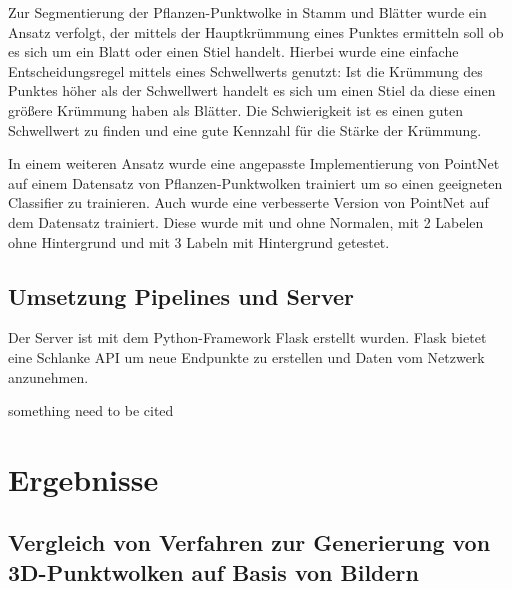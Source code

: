 \documentclass[12pt,titlepage]{article}
\begin{document}
Zur Segmentierung der Pflanzen-Punktwolke in Stamm und Blätter wurde ein Ansatz verfolgt, der mittels der Hauptkrümmung eines Punktes ermitteln soll ob es sich um ein Blatt oder einen Stiel handelt. 
Hierbei wurde eine einfache Entscheidungsregel mittels eines Schwellwerts genutzt: Ist die Krümmung des Punktes höher als der Schwellwert handelt es sich um einen Stiel da diese einen größere Krümmung haben als Blätter.
Die Schwierigkeit ist es einen guten Schwellwert zu finden und eine  gute Kennzahl für die Stärke der Krümmung.

In einem weiteren Ansatz wurde eine angepasste Implementierung von PointNet auf einem Datensatz von Pflanzen-Punktwolken trainiert um so einen geeigneten Classifier zu trainieren.
Auch wurde eine verbesserte Version von PointNet auf dem Datensatz trainiert. Diese wurde mit und ohne Normalen, mit 2 Labelen ohne Hintergrund und mit 3 Labeln mit Hintergrund getestet. 

\subsection{Umsetzung Pipelines und Server}
\label{sec:realisierung:implementierung2}
Der Server ist mit dem Python-Framework Flask erstellt wurden. Flask bietet eine Schlanke API um neue Endpunkte zu erstellen und Daten vom Netzwerk anzunehmen.

something need to be cited \cite{ThreeBasics}

\newpage
\section{Ergebnisse}
\label{sec:ergebnisse}
%

\subsection{Vergleich von Verfahren zur Generierung von 3D-Punktwolken auf Basis von Bildern}
\end{document}
